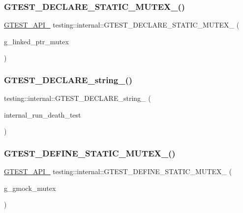 \subsubsection{\texorpdfstring{GTEST\_DECLARE\_STATIC\_MUTEX\_()}{GTEST\_DECLARE\_STATIC\_MUTEX\_()}}
{\footnotesize\ttfamily \mbox{\hyperlink{_obj__test_2lib_2googletest-release-1_88_81_2googletest_2include_2gtest_2internal_2gtest-port_8h_aa73be6f0ba4a7456180a94904ce17790}{G\+T\+E\+S\+T\+\_\+\+A\+P\+I\+\_\+}} testing\+::internal\+::\+G\+T\+E\+S\+T\+\_\+\+D\+E\+C\+L\+A\+R\+E\+\_\+\+S\+T\+A\+T\+I\+C\+\_\+\+M\+U\+T\+E\+X\+\_\+ (\begin{DoxyParamCaption}\item[{g\+\_\+linked\+\_\+ptr\+\_\+mutex}]{ }\end{DoxyParamCaption})}

\mbox{\label{namespacetesting_1_1internal_ac20f635c3285878fc1195ce687f23950}} 
\subsubsection{\texorpdfstring{GTEST\_DECLARE\_string\_()}{GTEST\_DECLARE\_string\_()}}
{\footnotesize\ttfamily testing\+::internal\+::\+G\+T\+E\+S\+T\+\_\+\+D\+E\+C\+L\+A\+R\+E\+\_\+string\+\_\+ (\begin{DoxyParamCaption}\item[{internal\+\_\+run\+\_\+death\+\_\+test}]{ }\end{DoxyParamCaption})}

\mbox{\label{namespacetesting_1_1internal_a8c4aa7be8daa7b60e293071d70a89584}} 
\subsubsection{\texorpdfstring{GTEST\_DEFINE\_STATIC\_MUTEX\_()}{GTEST\_DEFINE\_STATIC\_MUTEX\_()}\hspace{0.1cm}{\footnotesize\ttfamily [1/2]}}
{\footnotesize\ttfamily \mbox{\hyperlink{_obj__test_2lib_2googletest-release-1_88_81_2googletest_2include_2gtest_2internal_2gtest-port_8h_aa73be6f0ba4a7456180a94904ce17790}{G\+T\+E\+S\+T\+\_\+\+A\+P\+I\+\_\+}} testing\+::internal\+::\+G\+T\+E\+S\+T\+\_\+\+D\+E\+F\+I\+N\+E\+\_\+\+S\+T\+A\+T\+I\+C\+\_\+\+M\+U\+T\+E\+X\+\_\+ (\begin{DoxyParamCaption}\item[{g\+\_\+gmock\+\_\+mutex}]{ }\end{DoxyParamCaption})}

